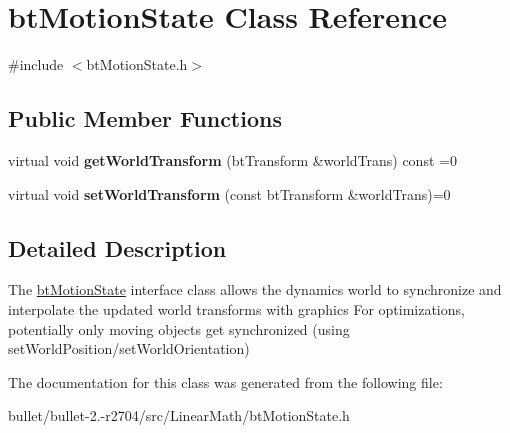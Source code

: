 \hypertarget{classbt_motion_state}{\section{bt\+Motion\+State Class Reference}
\label{classbt_motion_state}
}


{\ttfamily \#include $<$bt\+Motion\+State.\+h$>$}

\subsection*{Public Member Functions}
\begin{DoxyCompactItemize}
\item 
\hypertarget{classbt_motion_state_a5d30ed64161a4f36fe2affc3d3501412}{virtual void {\bfseries get\+World\+Transform} (bt\+Transform \&world\+Trans) const =0}\label{classbt_motion_state_a5d30ed64161a4f36fe2affc3d3501412}

\item 
\hypertarget{classbt_motion_state_afde01598075a93ef42ebb1493a2bf6fc}{virtual void {\bfseries set\+World\+Transform} (const bt\+Transform \&world\+Trans)=0}\label{classbt_motion_state_afde01598075a93ef42ebb1493a2bf6fc}

\end{DoxyCompactItemize}


\subsection{Detailed Description}
The \hyperlink{classbt_motion_state}{bt\+Motion\+State} interface class allows the dynamics world to synchronize and interpolate the updated world transforms with graphics For optimizations, potentially only moving objects get synchronized (using set\+World\+Position/set\+World\+Orientation) 

The documentation for this class was generated from the following file\+:\begin{DoxyCompactItemize}
\item 
bullet/bullet-\/2.-\/r2704/src/\+Linear\+Math/bt\+Motion\+State.\+h\end{DoxyCompactItemize}
